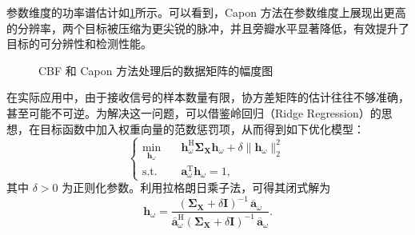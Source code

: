 \begin{solution}
    参数维度的功率谱估计如\cref{fig_compressed_capon2}所示。可以看到，Capon 方法在参数维度上展现出更高的分辨率，两个目标被压缩为更尖锐的脉冲，并且旁瓣水平显著降低，有效提升了目标的可分辨性和检测性能。
    \begin{figure}[htb!]
        \centering
        \caption{CBF 和 Capon 方法处理后的数据矩阵的幅度图}
        \label{fig_compressed_capon2}
    \end{figure}
\end{solution}


在实际应用中，由于接收信号的样本数量有限，协方差矩阵的估计往往不够准确，甚至可能不可逆。为解决这一问题，可以借鉴岭回归（Ridge Regression）的思想，在目标函数中加入权重向量的范数惩罚项，从而得到如下优化模型：
\[
    \begin{cases}
        \min\limits_{\bm{h}_{\omega}} \quad &
        \bm{h}_{\omega}^{\mathrm{H}} \mathbf{\Sigma}_{\mathbf{X}} \bm{h}_{\omega}
        + \delta \|\bm{h}_{\omega}\|_2^2                                                        \\
        \text{s.t.} \quad                   & \bm{a}_{\omega}^{\mathrm{T}} \bm{h}_{\omega} = 1,
    \end{cases}
\]
其中 \(\delta > 0\) 为正则化参数。利用拉格朗日乘子法，可得其闭式解为
\[
    \bm{h}_{\omega}
    = \frac{(\mathbf{\Sigma}_{\mathbf{X}} + \delta \mathbf{I})^{-1} \,\overline{\bm{a}}_{\omega}}
    {\overline{\bm{a}}_{\omega}^{\mathrm{H}} (\mathbf{\Sigma}_{\mathbf{X}} + \delta \mathbf{I})^{-1} \,\overline{\bm{a}}_{\omega}}.
\]

